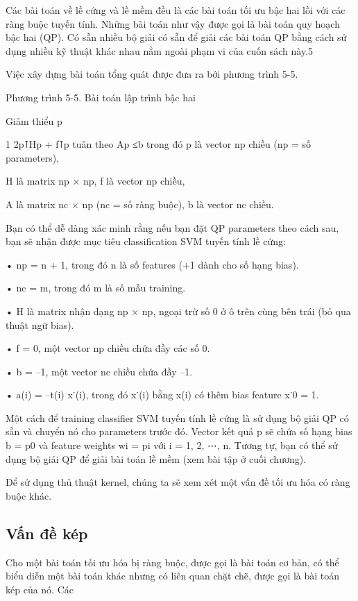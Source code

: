Các bài toán về lề cứng và lề mềm đều là các bài toán tối ưu bậc hai lồi với các ràng buộc tuyến tính. Những bài toán như vậy được gọi là bài toán quy hoạch bậc hai (QP). Có sẵn nhiều bộ giải có sẵn để giải các bài toán QP bằng cách sử dụng nhiều kỹ thuật khác nhau nằm ngoài phạm vi của cuốn sách này.5

Việc xây dựng bài toán tổng quát được đưa ra bởi phương trình 5-5.

Phương trình 5-5. Bài toán lập trình bậc hai

Giảm thiểu p

1 2p⊺Hp + f⊺p tuân theo Ap ≤b trong đó p là vector np chiều (np = số parameters),

H là matrix np × np, f là vector np chiều,

A là matrix nc × np (nc = số ràng buộc), b là vector nc chiều.

Bạn có thể dễ dàng xác minh rằng nếu bạn đặt QP parameters theo cách sau, bạn sẽ nhận được mục tiêu classification SVM tuyến tính lề cứng:

• np = n + 1, trong đó n là số features (+1 dành cho số hạng bias).

• nc = m, trong đó m là số mẫu training.

• H là matrix nhận dạng np × np, ngoại trừ số 0 ở ô trên cùng bên trái (bỏ qua thuật ngữ bias).

• f = 0, một vector np chiều chứa đầy các số 0.

• b = –1, một vector nc chiều chứa đầy –1.

• a(i) = –t(i) x˙(i), trong đó x˙(i) bằng x(i) có thêm bias feature x˙0 = 1.

Một cách để training classifier SVM tuyến tính lề cứng là sử dụng bộ giải QP có sẵn và chuyển nó cho parameters trước đó. Vector kết quả p sẽ chứa số hạng bias b = p0 và feature weights wi = pi với i = 1, 2, ⋯, n. Tương tự, bạn có thể sử dụng bộ giải QP để giải bài toán lề mềm (xem bài tập ở cuối chương).

Để sử dụng thủ thuật kernel, chúng ta sẽ xem xét một vấn đề tối ưu hóa có ràng buộc khác.

\subsection{Vấn đề kép}

Cho một bài toán tối ưu hóa bị ràng buộc, được gọi là bài toán cơ bản, có thể biểu diễn một bài toán khác nhưng có liên quan chặt chẽ, được gọi là bài toán kép của nó. Các

